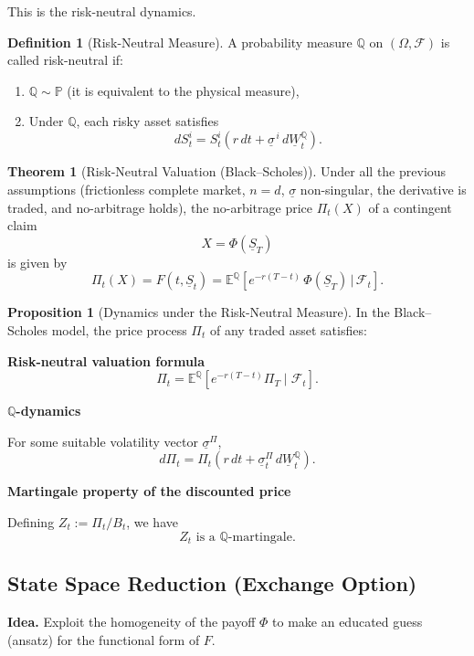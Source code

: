 \documentclass[12pt,a4paper]{article}
\theoremstyle{definition}
\newtheorem{definition}{Definition}[section]
\newtheorem{theorem}{Theorem}[section]
\newtheorem{proposition}{Proposition}[section]
\newcommand{\E}{\mathbb{E}}
\begin{document}
This is the risk-neutral dynamics.

\begin{definition}[Risk-Neutral Measure]
A probability measure $\mathbb{Q}$ on $(\Omega, \mathcal{F})$ is called risk-neutral if:
\begin{enumerate}
\item $\mathbb{Q} \sim \mathbb{P}$ (it is equivalent to the physical measure),
\item Under $\mathbb{Q}$, each risky asset satisfies
\[
dS_t^i = S_t^i(r \, dt + \underline{\sigma}^{\,i} \, d\underline{W}_t^\mathbb{Q}).
\]
\end{enumerate}
\end{definition}

\begin{theorem}[Risk-Neutral Valuation (Black--Scholes)]
Under all the previous assumptions (frictionless complete market, $n = d$, $\underline{\sigma}$ non-singular, the derivative is traded, and no-arbitrage holds), the no-arbitrage price $\Pi_t(X)$ of a contingent claim
\[
X = \Phi(\underline{S}_T)
\]
is given by
\[
\Pi_t(X) = F(t, \underline{S}_t) = \E^\mathbb{Q}\left[e^{-r(T-t)} \, \Phi(\underline{S}_T) \,\Big|\, \mathcal{F}_t\right].
\]
\end{theorem}

\begin{proposition}[Dynamics under the Risk-Neutral Measure]
In the Black--Scholes model, the price process $\Pi_t$ of any traded asset satisfies:

\textbf{Risk-neutral valuation formula}
\[
\Pi_t = \E^\mathbb{Q}\left[e^{-r(T-t)} \Pi_T \mid \mathcal{F}_t\right].
\]

\textbf{$\mathbb{Q}$-dynamics}

For some suitable volatility vector $\underline{\sigma}^\Pi$,
\[
d\Pi_t = \Pi_t(r \, dt + \underline{\sigma}_t^\Pi \, d\underline{W}_t^\mathbb{Q}).
\]

\textbf{Martingale property of the discounted price}

Defining $Z_t := \Pi_t / B_t$, we have
\[
Z_t \text{ is a } \mathbb{Q}\text{-martingale}.
\]
\end{proposition}

\subsection{State Space Reduction (Exchange Option)}

\textbf{Idea.} Exploit the homogeneity of the payoff $\Phi$ to make an educated guess (ansatz) for the functional form of $F$.
\end{document}

